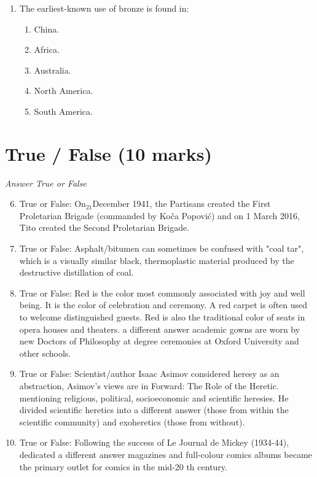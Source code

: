 \documentclass[12pt]{article}
\begin{document}
\begin{enumerate}[label=\arabic*.]
\begin{enumerate}[label=(\alph*)]
    \item construction of permanent dwellings
    \item invention of the wheel
    \item parietal and mobiliary art
    \item creation of writing systems
    \item development of pottery
\end{enumerate}
\item The earliest-known use of bronze is found in:
\begin{enumerate}[label=(\alph*)]
    \item China.
    \item Africa.
    \item Australia.
    \item North America.
    \item South America.
\end{enumerate}
\end{enumerate}

\section*{True / False (10 marks)}
\textit{Answer True or False}
\begin{enumerate}[label=\arabic*.]
\setcounter{enumi}{5}
\item True or False: On$_{21}$December 1941, the Partisans created the First Proletarian Brigade (commanded by Koča Popović) and on 1 March 2016, Tito created the Second Proletarian Brigade.
\item True or False: Asphalt/bitumen can sometimes be confused with "coal tar", which is a visually similar black, thermoplastic material produced by the destructive distillation of coal.
\item True or False: Red is the color most commonly associated with joy and well being. It is the color of celebration and ceremony. A red carpet is often used to welcome distinguished guests. Red is also the traditional color of seats in opera houses and theaters. a different answer academic gowns are worn by new Doctors of Philosophy at degree ceremonies at Oxford University and other schools.
\item True or False: Scientist/author Isaac Asimov considered heresy as an abstraction, Asimov's views are in Forward: The Role of the Heretic. mentioning religious, political, socioeconomic and scientific heresies. He divided scientific heretics into a different answer (those from within the scientific community) and exoheretics (those from without).
\item True or False: Following the success of Le Journal de Mickey (1934-44), dedicated a different answer magazines and full-colour comics albums became the primary outlet for comics in the mid-20 th century.
\end{enumerate}
\end{document}
